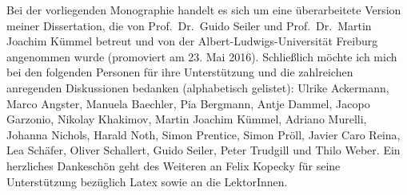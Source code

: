 Bei der vorliegenden Monographie handelt es sich um eine überarbeitete Version meiner Dissertation, die von Prof.\ Dr.\ Guido Seiler und Prof.\ Dr.\ Martin Joachim Kümmel betreut und von der Albert-Ludwigs-Universität Freiburg angenommen wurde (promoviert am 23. Mai 2016). Schließlich möchte ich mich bei den folgenden Personen für ihre Unterstützung und die zahlreichen anregenden Diskussionen bedanken (alphabetisch gelistet): Ulrike Ackermann, Marco Angster, Manuela Baechler, Pia Bergmann, Antje Dammel, Jacopo Garzonio, Nikolay Khakimov, Martin Joachim Kümmel, Adriano Murelli, Johanna Nichols, Harald Noth, Simon Prentice, Simon Pröll, Javier Caro Reina, Lea Schäfer, Oliver Schallert, Guido Seiler, Peter Trudgill und Thilo Weber. Ein herzliches Dankeschön geht des Weiteren an Felix Kopecky für seine Unterstützung bezüglich Latex sowie an die LektorInnen.